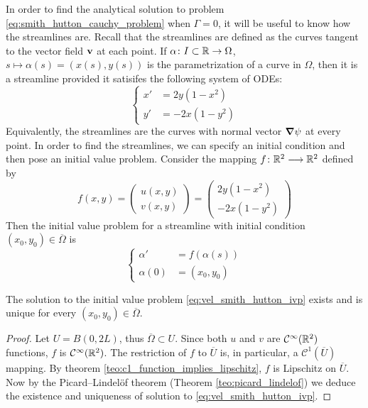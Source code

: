 In order to find the analytical solution to problem
\eqref{eq:smith_hutton_cauchy_problem} when $\Gamma = 0$, it will be useful to
know how the streamlines are. Recall that the streamlines are defined as the
curves tangent to the vector field $\vb{v}$ at each point. If $\alpha \colon I
\subset \mathbb{R} \to \Omega$, $s \mapsto \alpha(s) = (x(s), y(s))$ is the
parametrization of a curve in $\Omega$, then it is a streamline provided it
satisifes the following system of ODEs:
\begin{equation} \label{eq:velocity_smith_hutton_odes}
	\left\{
	\begin{aligned}
		x' &= 2 y (1 - x^2) \\
		y' &= - 2 x (1 - y^2)
	\end{aligned}
	\right.
\end{equation}
Equivalently, the streamlines are the curves with normal vector $\grad{\psi}$
at every point. In order to find the streamlines, we can specify an initial
condition and then pose an initial value problem. Consider the mapping $f \colon
\mathbb{R}^2 \longrightarrow \mathbb{R}^2$ defined by
\begin{equation*}
	f(x,y) = 
	\begin{pmatrix}
		u(x,y) \\ v(x,y)
	\end{pmatrix} =
	\begin{pmatrix}
		2 y (1 - x^2) \\ - 2 x (1 - y^2)
	\end{pmatrix}
\end{equation*}
Then the initial value problem for a streamline with initial condition $(x_0,y_0) \in \overline{\Omega}$ is
\begin{equation} \label{eq:vel_smith_hutton_ivp}
	\left\{
		\begin{aligned}
			\alpha' &= f(\alpha(s)) \\
			\alpha(0) &= (x_0, y_0)
		\end{aligned}
	\right.
\end{equation}

\begin{prop}
	The solution to the initial value problem \eqref{eq:vel_smith_hutton_ivp}
	exists and is unique for every $(x_0, y_0) \in \overline{\Omega}$.
\end{prop}
\begin{proof}
	Let $U = B(0,2L)$, thus $\overline{\Omega} \subset U$. Since both $u$ and
	$v$ are $\mathcal{C}^\infty(\mathbb{R}^2)$ functions, $f$ is
	$\mathcal{C}^\infty(\mathbb{R}^2)$. The restriction of $f$ to $\overline{U}$ is,
	in particular, a $\mathcal{C}^1(\overline{U})$ mapping. By theorem
	\ref{teo:c1_function_implies_lipschitz}, $f$ is Lipschitz on $\overline{U}$.
	Now by the Picard--Lindelöf theorem (Theorem \ref{teo:picard_lindelof}) we
	deduce the existence and uniqueness of solution to
	\eqref{eq:vel_smith_hutton_ivp}.
\end{proof}

